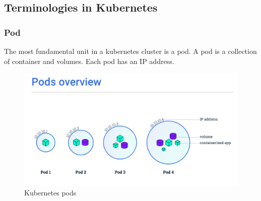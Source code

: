 \documentclass[12pt]{article}
\begin{document}
\subsection{Terminologies in Kubernetes}
\subsubsection{Pod}
The most fundamental unit in a kubernetes cluster is a pod. A pod is a collection of container and volumes. Each pod has an IP address.\\
\begin{figure}[h!]
	\begin{center}
		\includegraphics[width=\textwidth, trim= 0 0 0 7cm, clip=true]{pods}
		\caption{Kubernetes pods}
	\end{center}
\end{figure}
\end{document}
